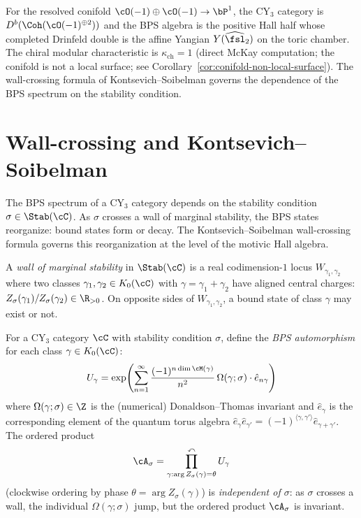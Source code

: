 \begin{example}
\label{ex:resolved-conifold}
For the resolved conifold $\cO(-1) \oplus \cO(-1) \to \bP^1$, the
CY$_3$ category is $D^b(\Coh(\cO(-1)^{\oplus 2}))$ and the BPS
algebra is the positive Hall half whose completed Drinfeld double is
the affine Yangian $Y(\widehat{\fsl}_2)$ on the toric chamber. The
chiral modular characteristic is
$\kappa_{\mathrm{ch}} = 1$
(direct McKay computation; the conifold is not a local surface; see
Corollary~\ref{cor:conifold-non-local-surface}). The wall-crossing
formula of Kontsevich--Soibelman governs the dependence of the
BPS spectrum on the stability condition.
\end{example}


\section{Wall-crossing and Kontsevich--Soibelman}
\label{sec:wall-crossing-ks}

The BPS spectrum of a CY$_3$ category depends on the stability
condition $\sigma \in \Stab(\cC)$. As $\sigma$ crosses a wall of
marginal stability, the BPS states reorganize: bound states form or
decay. The Kontsevich--Soibelman wall-crossing formula governs
this reorganization at the level of the motivic Hall algebra.

\begin{definition}
\label{def:wall-marginal}
A \emph{wall of marginal stability} in $\Stab(\cC)$ is a real
codimension-$1$ locus $W_{\gamma_1, \gamma_2}$ where two classes
$\gamma_1, \gamma_2 \in K_0(\cC)$ with $\gamma = \gamma_1 + \gamma_2$
have aligned central charges:
$Z_\sigma(\gamma_1)/Z_\sigma(\gamma_2) \in \R_{>0}$.
On opposite sides of $W_{\gamma_1, \gamma_2}$, a bound state of
class $\gamma$ may exist or not.
\end{definition}

\begin{theorem}
\label{thm:ks-wall-crossing}
For a CY$_3$ category $\cC$ with stability condition $\sigma$,
define the \emph{BPS automorphism} for each class
$\gamma \in K_0(\cC)$:
\[
 U_\gamma = \exp\!\left(
 \sum_{n=1}^{\infty} \frac{(-1)^{n \dim \cM(\gamma)}}{n^2}\,
 \Omega(\gamma; \sigma) \cdot \hat{e}_{n\gamma}
 \right)
\]
where $\Omega(\gamma; \sigma) \in \Z$ is the (numerical)
Donaldson--Thomas invariant and $\hat{e}_\gamma$ is the
corresponding element of the quantum torus algebra
$\hat{e}_\gamma \hat{e}_{\gamma'} = (-1)^{\langle \gamma, \gamma' \rangle}
\hat{e}_{\gamma + \gamma'}$. The ordered product
\[
 \cA_\sigma = \prod_{\gamma : \arg Z_\sigma(\gamma) = \theta}^{\curvearrowleft}
 U_\gamma
\]
(clockwise ordering by phase $\theta = \arg Z_\sigma(\gamma)$) is
\emph{independent of $\sigma$}: as $\sigma$ crosses a wall, the
individual $\Omega(\gamma; \sigma)$ jump, but the ordered product
$\cA_\sigma$ is invariant.
\end{theorem}

